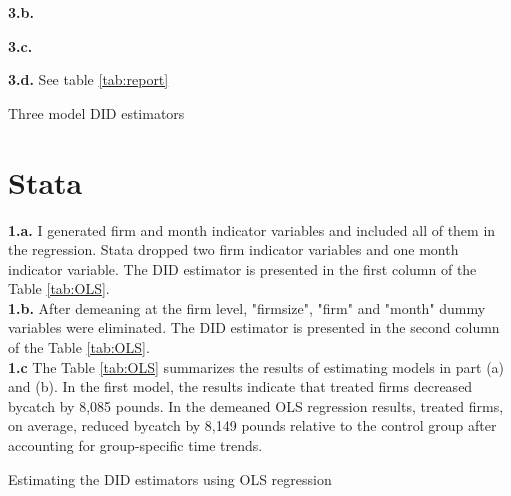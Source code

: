 \documentclass{article}
\begin{document}
\noindent \textbf{3.b.} 

\noindent \textbf{3.c.} 

\noindent \textbf{3.d.} See table \ref{tab:report}

\begin{table}[h]
    \centering
    
    \caption{Three model DID estimators}
    \label{tab:report}
\end{table}


\section{Stata}

\noindent \textbf{1.a.} I generated firm and month indicator variables and included all of them in the regression. Stata dropped two firm indicator variables and one month indicator variable. The DID estimator is presented in the first column of the Table \ref{tab:OLS}. \\

\noindent \textbf{1.b.} After demeaning at the firm level, "firmsize", "firm" and "month" dummy variables were eliminated. The DID estimator is presented in the second column of the Table \ref{tab:OLS}. \\

\noindent \textbf{1.c} The Table \ref{tab:OLS} summarizes the results of estimating models in part (a) and (b). In the first model, the results indicate that treated firms decreased bycatch by 8,085 pounds. In the demeaned OLS regression results, treated firms, on average, reduced bycatch by 8,149 pounds relative to the control group after accounting for group-specific time trends.

\begin{table}[h]
    \centering
    
    \caption{Estimating the DID estimators using OLS regression}
    \label{tab:OLS}
\end{table}
\end{document}
